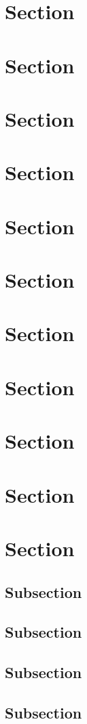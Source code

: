 {{{{\section{Section}
\section{Section}
\section{Section}
\section{Section}
\section{Section}
\section{Section}
\section{Section}
\section{Section}
\section{Section}
\section{Section}
\section{Section}
\subsection{Subsection}
\label{ssec:example}
\lipsum
\subsection{Subsection}
\subsection{Subsection}
\subsection{Subsection}
}}}}
